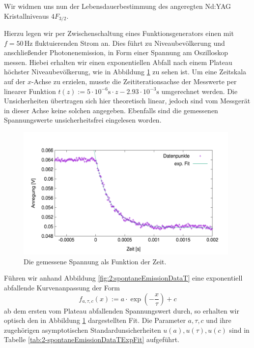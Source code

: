 \documentclass[../../main.tex]{subfiles}
\begin{document}
    Wir widmen uns nun der Lebensdauerbestimmung des angeregten Nd:YAG Kristallniveaus $4F_{3/2}$. 

    Hierzu legen wir per Zwischenschaltung eines Funktionsgenerators einen mit $f = 50\,\si{\hertz}$ fluktuierenden Strom an. Dies führt zu Niveaubevölkerung und anschließender Photonenemission, in Form einer Spannung am Oszilloskop messen. Hiebei erhalten wir einen exponentiellen Abfall nach einem Plateau höchster Niveaubevölkerung, wie in Abbildung \ref{fig:2-spontaneEmissionDataT} zu sehen ist. Um eine Zeitskala auf der $x$-Achse zu erzielen, musste die Zeititerationsachse der Messwerte per linearer Funktion $t(z) := 5\cdot 10^{-6}\si{\s}\cdot z - 2.93\cdot 10^{-3}\si{\s}$ umgerechnet werden. Die Unsicherheiten übertragen sich hier theoretisch linear, jedoch sind vom Messgerät in dieser Achse keine solchen angegeben. Ebenfalls sind die gemessenen Spannungswerte unsicherheitsfrei eingelesen worden. 
    \begin{figure}[H]
        \centering
        \includegraphics[width=11cm]{../../Bilddateien/2/spontane_emission_data_t.png}
        \caption{Die gemessene Spannung als Funktion der Zeit.}
        \label{fig:2-spontaneEmissionDataT}
    \end{figure}
    Führen wir anhand Abbildung \ref{fig:2:spontaneEmissionDataT} eine exponentiell abfallende Kurvenanpassung der Form 
    \[
        f_{a,\tau,c}(x) := a\cdot \exp(-\frac{x}{\tau}) + c
    \]
    ab dem ersten vom Plateau abfallenden Spannungswert durch, so erhalten wir optisch den in Abbildung \ref{fig:2-spontaneEmissionDataT} dargestellten Fit. Die Parameter $a,\tau,c$ und ihre zugehörigen asymptotischen Standardunsicherheiten $u(a),u(\tau),u(c)$ sind in Tabelle \ref{tab:2-spontaneEmissionDataTExpFit} aufgeführt.
    
\end{document}
